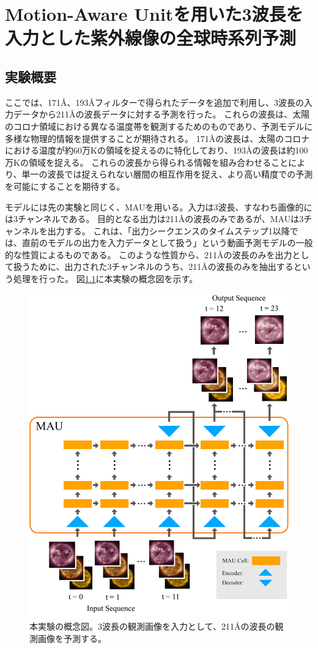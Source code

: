 \chapter{Motion-Aware Unitを用いた3波長を入力とした紫外線像の全球時系列予測}
  \section{実験概要}
    ここでは、171Å、193Åフィルターで得られたデータを追加で利用し、3波長の入力データから211Åの波長データに対する予測を行った。
    これらの波長は、太陽のコロナ領域における異なる温度帯を観測するためのものであり、予測モデルに多様な物理的情報を提供することが期待される。
    171Åの波長は、太陽のコロナにおける温度が約60万Kの領域を捉えるのに特化しており、193Åの波長は約100万Kの領域を捉える。
    これらの波長から得られる情報を組み合わせることにより、単一の波長では捉えられない層間の相互作用を捉え、より高い精度での予測を可能にすることを期待する。
    
    モデルには先の実験と同じく、MAUを用いる。入力は3波長、すなわち画像的には3チャンネルである。
    目的となる出力は211Åの波長のみであるが、MAUは3チャンネルを出力する。
    これは、「出力シークエンスのタイムステップ1以降では、直前のモデルの出力を入力データとして扱う」という動画予測モデルの一般的な性質によるものである。
    このような性質から、211Åの波長のみを出力として扱うために、出力された3チャンネルのうち、211Åの波長のみを抽出するという処理を行った。
    図\ref{fig:exp2_concept}に本実験の概念図を示す。
    \begin{figure}[htbp]
      \centering
      \includegraphics[width=\textwidth]{figures/exp2/exp2_concept.jpg}
      \caption{本実験の概念図。3波長の観測画像を入力として、211Åの波長の観測画像を予測する。}
      \label{fig:exp2_concept}
    \end{figure}

